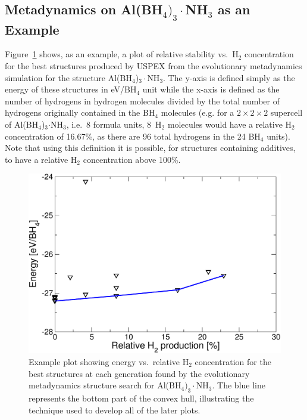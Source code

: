 \documentclass[twocolumn, prb, showpacs]{revtex4-1}
\begin{document}
\subsection{Metadynamics on Al(BH$_4)_3\cdot$NH$_3$ as an Example}



Figure~\ref{fig:example_plot} shows, as an example, a plot of relative
stability vs.\ H$_2$ concentration for the best structures produced by USPEX
from the evolutionary metadynamics simulation for the structure
Al(BH$_4$)$_3\cdot$NH$_3$. The y-axis is defined simply as the energy of these
structures in eV/BH$_4$ unit while the x-axis is defined as the number of hydrogens in
hydrogen molecules divided by the total number of hydrogens originally
contained in the BH$_4$ molecules (e.g. for a $2\times2\times2$ supercell of
Al(BH$_4$)$_3$$\cdot$NH$_3$, i.e.\ 8 formula units, 8~H$_2$ molecules would have a relative H$_2$
concentration of 16.67\%, as there are 96 total hydrogens in the 24 BH$_4$ units). Note that using this definition
it is possible, for structures containing additives, to have a relative H$_2$ concentration above 100\%.


\begin{figure}
\begin{center}\includegraphics[width=0.85\columnwidth]{example1}\end{center}
\caption{\label{fig:example_plot}Example plot showing energy vs.\ relative H$_2$ concentration for
the best structures at each generation found by the evolutionary metadynamics structure search
for Al(BH$_4)_3\cdot$NH$_3$. The blue line represents the bottom part of the convex hull, illustrating
the technique used to develop all of the later plots.}
\end{figure}
\end{document}
